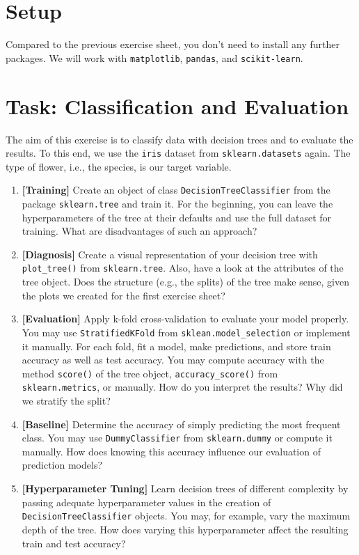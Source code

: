 \documentclass[12pt]{article}
\newcommand{\code}[1]{\textcolor{kitgreen}{\texttt{#1}}}
\newcommand{\taskname}[1]{\textcolor{kitblue}{\textbf{[#1]}}}
\begin{document}
\section*{Setup}

Compared to the previous exercise sheet, you don't need to install any further packages.
We will work with \code{matplotlib}, \code{pandas}, and \code{scikit-learn}.

\section*{Task: Classification and Evaluation}

The aim of this exercise is to classify data with decision trees and to evaluate the results.
To this end, we use the \code{iris} dataset from \code{sklearn.datasets} again.
The type of flower, i.e., the species, is our target variable.

\begin{enumerate}[label=\alph*), left=0pt, itemsep=12pt]
	\item
	\taskname{Training}
	Create an object of class \code{DecisionTreeClassifier} from the package \code{sklearn.tree} and train it.
	For the beginning, you can leave the hyperparameters of the tree at their defaults and use the full dataset for training.
	\newline
	What are disadvantages of such an approach?
	\item
	\taskname{Diagnosis}
	Create a visual representation of your decision tree with \code{plot\_tree()} from \code{sklearn.tree}.
	Also, have a look at the attributes of the tree object.
	\newline
	Does the structure (e.g., the splits) of the tree make sense, given the plots we created for the first exercise sheet?
	\item
	\taskname{Evaluation}
	Apply k-fold cross-validation to evaluate your model properly.
	You may use \code{StratifiedKFold} from \code{sklean.model\_selection} or implement it manually.
	For each fold, fit a model, make predictions, and store train accuracy as well as test accuracy.
	You may compute accuracy with the method \code{score()} of the tree object, \code{accuracy\_score()} from \code{sklearn.metrics}, or manually.
	\newline
	How do you interpret the results?
	Why did we stratify the split?
	\item
	\taskname{Baseline}
	Determine the accuracy of simply predicting the most frequent class.
	You may use \code{DummyClassifier} from \code{sklearn.dummy} or compute it manually.
	\newline
	How does knowing this accuracy influence our evaluation of prediction models?
	\item
	\taskname{Hyperparameter Tuning}
	Learn decision trees of different complexity by passing adequate hyperparameter values in the creation of \code{DecisionTreeClassifier} objects.
	You may, for example, vary the maximum depth of the tree.
	\newline
	How does varying this hyperparameter affect the resulting train and test accuracy?
\end{enumerate}
\end{document}
